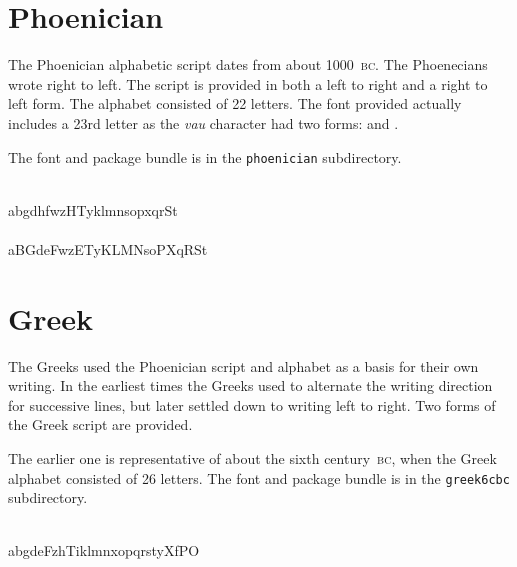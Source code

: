 \documentclass{article}
\newcommand{\BC}{\textsc{bc}}
\begin{document}
\section{Phoenician}

    The Phoenician alphabetic script dates from about 1000~\BC. 
The Phoenecians wrote right to left. The script is provided in both a
left to right and a right to left form. The alphabet consisted of
22 letters. The font provided actually includes a 23rd letter as
the \textit{vau} character had two forms:  and .

    The font and package bundle is in the \texttt{phoenician} subdirectory.

\begin{center}
\phncfamily
\Aaleph \Abeth \Agimel \Adaleth \Ahe \Avaf \Avav \Azayin \Aheth \Ateth
\Ayod \Akaph \Alamed \Amem \Anun \Asamekh \Aayin \Ape \Asade \Aqoph 
\Aresh \Ashin \Atav \\
abgdhfwzHTyklmnsopxqrSt \\
\ARaleph \ARbeth \ARgimel \ARdaleth \ARhe \ARvaf \ARvav \ARzayin \ARheth \ARteth
\ARyod \ARkaph \ARlamed \ARmem \ARnun \ARsamekh \ARayin \ARpe \ARsade \ARqoph 
\ARresh \ARshin \ARtav \\
aBGdeFwzETyKLMNsoPXqRSt \\
\end{center}

\section{Greek}

    The Greeks used the Phoenician script and alphabet as a basis for their
own writing. In the earliest times the Greeks used to alternate the writing
direction for successive lines, but later settled down to writing left to 
right. Two forms of the Greek script are provided. 

The earlier one is representative of about the sixth century~\BC, when the
Greek alphabet consisted of 26 letters.
    The font and package bundle is in the \texttt{greek6cbc} subdirectory.

\begin{center}
\gvibcfamily
\Aalpha \Abeta \Agamma \Adelta \Aepsilon \Adigamma \Azeta \Aeta
\Atheta \Aiota \Akappa \Alambda \Amu \Anu \Axi \Aomicron \Api \Akoppa
\Arho \Asigma \Atau \Aupsilon \Achi \Aphi \Apsi \Aomega \\
abgdeFzhTiklmnxopqrstyXfPO \\
\end{center}
\end{document}

